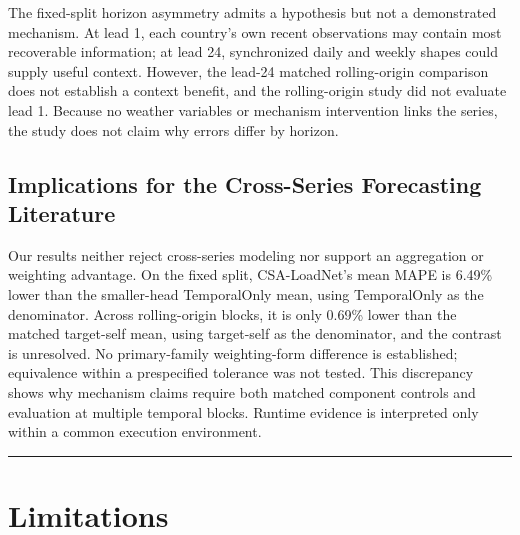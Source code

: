 \documentclass[electronics,article,submit,moreauthors]{Definitions/mdpi}
\begin{document}
The fixed-split horizon asymmetry admits a hypothesis but not a demonstrated mechanism. At lead 1, each country's own recent observations may contain most recoverable information; at lead 24, synchronized daily and weekly shapes could supply useful context. However, the lead-24 matched rolling-origin comparison does not establish a context benefit, and the rolling-origin study did not evaluate lead 1. Because no weather variables or mechanism intervention links the series, the study does not claim why errors differ by horizon.

\subsection{Implications for the Cross-Series Forecasting Literature}\label{implications-for-the-cross-series-forecasting-literature}

Our results neither reject cross-series modeling nor support an aggregation or weighting advantage. On the fixed split, CSA-LoadNet's mean MAPE is 6.49\% lower than the smaller-head TemporalOnly mean, using TemporalOnly as the denominator. Across rolling-origin blocks, it is only 0.69\% lower than the matched target-self mean, using target-self as the denominator, and the contrast is unresolved. No primary-family weighting-form difference is established; equivalence within a prespecified tolerance was not tested. This discrepancy shows why mechanism claims require both matched component controls and evaluation at multiple temporal blocks. Runtime evidence is interpreted only within a common execution environment.

\begin{center}\rule{0.5\linewidth}{0.5pt}\end{center}

\section{Limitations}\label{limitations}
\end{document}
